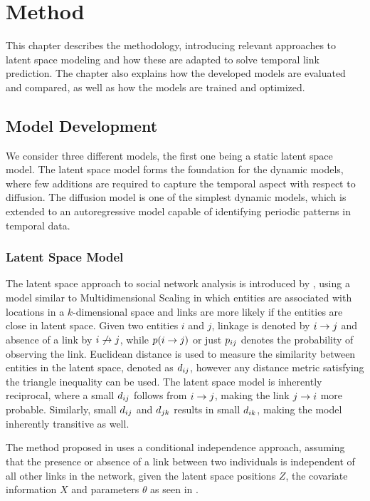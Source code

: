 
\chapter{Method}\label{ch:Method}

This chapter describes the methodology, introducing relevant approaches to latent space modeling and how these are adapted to solve temporal link prediction. The chapter also explains how the developed models are evaluated and compared, as well as how the models are trained and optimized.

\section{Model Development}

    We consider three different models, the first one being a static latent space model. The latent space model forms the foundation for the dynamic models, where few additions are required to capture the temporal aspect with respect to diffusion. The diffusion model is one of the simplest dynamic models, which is extended to an autoregressive model capable of identifying periodic patterns in temporal data.

    \subsection{Latent Space Model}
    
        The latent space approach to social network analysis is introduced by \citeauthor{hoff2002latent} \cite{hoff2002latent}, using a model similar to Multidimensional Scaling in which entities are associated with locations in a $k$-dimensional space and links are more likely if the entities are close in latent space.
        Given two entities $i$ and $j$, linkage is denoted by $\link$ and absence of a link by $\link*$, while $p(\link)$ or just $\sub(p)$ denotes the probability of observing the link. 
        Euclidean distance is used to measure the similarity between entities in the latent space, denoted as $\sub(d)$, however any distance metric satisfying the triangle inequality can be used.
        The latent space model is inherently reciprocal, where a small $\sub(d)$ follows from $\link$, making the link $\link(j)(i)$ more probable. Similarly, small $\sub(d)$ and $\sub(d)(jk)$ results in small $\sub(d)(ik)$, making the model inherently transitive as well.
        
        The method proposed in \cite{hoff2002latent} uses a conditional independence approach, assuming that the presence or absence of a link between two individuals is independent of all other links in the network, given the latent space positions $Z$, the covariate information $X$ and parameters $\theta$ as seen in . 
        
